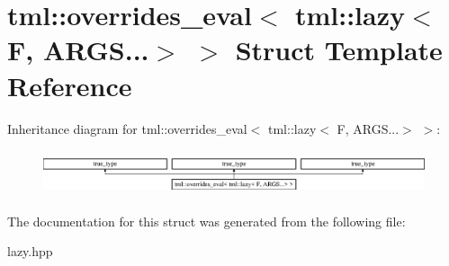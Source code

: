 \hypertarget{structtml_1_1overrides__eval_3_01tml_1_1lazy_3_01F_00_01ARGS_8_8_8_4_01_4}{\section{tml\+:\+:overrides\+\_\+eval$<$ tml\+:\+:lazy$<$ F, A\+R\+G\+S...$>$ $>$ Struct Template Reference}
\label{structtml_1_1overrides__eval_3_01tml_1_1lazy_3_01F_00_01ARGS_8_8_8_4_01_4}
}
Inheritance diagram for tml\+:\+:overrides\+\_\+eval$<$ tml\+:\+:lazy$<$ F, A\+R\+G\+S...$>$ $>$\+:\begin{figure}[H]
\begin{center}
\leavevmode
\includegraphics[height=1.352657cm]{structtml_1_1overrides__eval_3_01tml_1_1lazy_3_01F_00_01ARGS_8_8_8_4_01_4}
\end{center}
\end{figure}


The documentation for this struct was generated from the following file\+:\begin{DoxyCompactItemize}
\item 
lazy.\+hpp\end{DoxyCompactItemize}
